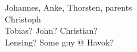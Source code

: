 \documentclass[thesis.tex]{subfiles}
\begin{document}
\label{chap:acknowledgements}

Johannes, Anke, Thorsten, parents\\
Christoph\\
Tobias? John? Christian?\\
Lensing? Some guy @ Havok?

\newpage
\end{document}
